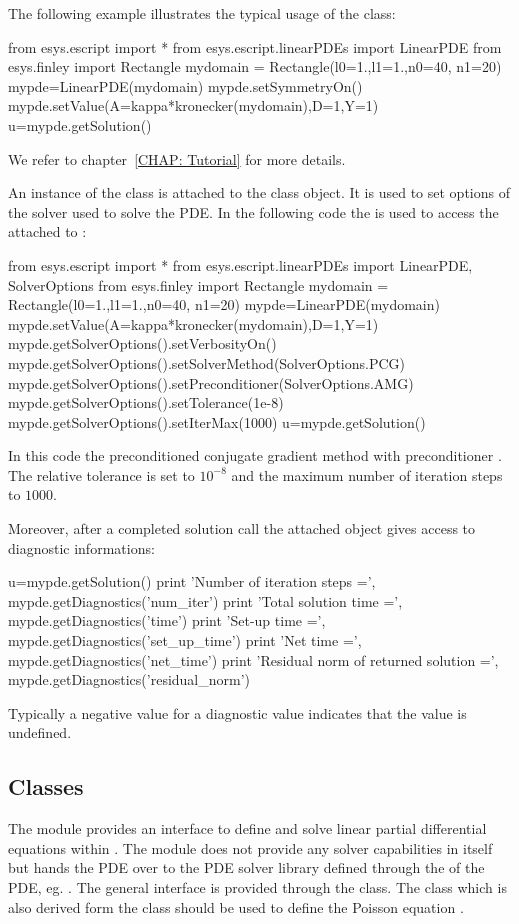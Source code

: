 The following example illustrates the typical usage of the \LinearPDE class:
\begin{python}
from esys.escript import *
from esys.escript.linearPDEs import LinearPDE
from esys.finley import Rectangle
mydomain = Rectangle(l0=1.,l1=1.,n0=40, n1=20)
mypde=LinearPDE(mydomain)
mypde.setSymmetryOn()
mypde.setValue(A=kappa*kronecker(mydomain),D=1,Y=1)
u=mypde.getSolution()
\end{python}
We refer to chapter~\ref{CHAP: Tutorial} for more details.

An instance of the \SolverOptions class is attached to the \LinearPDE class object. It is used to set options of the solver used to solve the PDE. In the following
code the  is used to access the  \SolverOptions 
attached to :
\begin{python}
from esys.escript import *
from esys.escript.linearPDEs import LinearPDE, SolverOptions
from esys.finley import Rectangle
mydomain = Rectangle(l0=1.,l1=1.,n0=40, n1=20)
mypde=LinearPDE(mydomain)
mypde.setValue(A=kappa*kronecker(mydomain),D=1,Y=1)
mypde.getSolverOptions().setVerbosityOn()
mypde.getSolverOptions().setSolverMethod(SolverOptions.PCG)
mypde.getSolverOptions().setPreconditioner(SolverOptions.AMG)
mypde.getSolverOptions().setTolerance(1e-8)
mypde.getSolverOptions().setIterMax(1000)
u=mypde.getSolution()
\end{python}
In this code the preconditioned conjugate gradient method \PCG
with preconditioner \AMG. The relative tolerance is set to $10^{-8}$ and
the maximum number of iteration steps to $1000$.

Moreover, after a completed solution call
the attached  \SolverOptions object gives access to diagnostic informations: 
\begin{python}
u=mypde.getSolution()
print 'Number of iteration steps =', mypde.getDiagnostics('num_iter')
print 'Total solution time =', mypde.getDiagnostics('time')
print 'Set-up time =', mypde.getDiagnostics('set_up_time')
print 'Net time =', mypde.getDiagnostics('net_time')
print 'Residual norm of returned solution =', mypde.getDiagnostics('residual_norm')
\end{python}
Typically a negative value for a diagnostic value indicates that the value is undefined.

\subsection{Classes}
The module \linearPDEs provides an interface to define and solve linear partial
differential equations within \escript. The module \linearPDEs does not provide any
solver capabilities in itself but hands the PDE over to
the PDE solver library defined through the \Domain of the PDE, eg. \finley.
The general interface is provided through the \LinearPDE class. The \Poisson
class which is also derived form the \LinearPDE class should be used
to define the Poisson equation .

